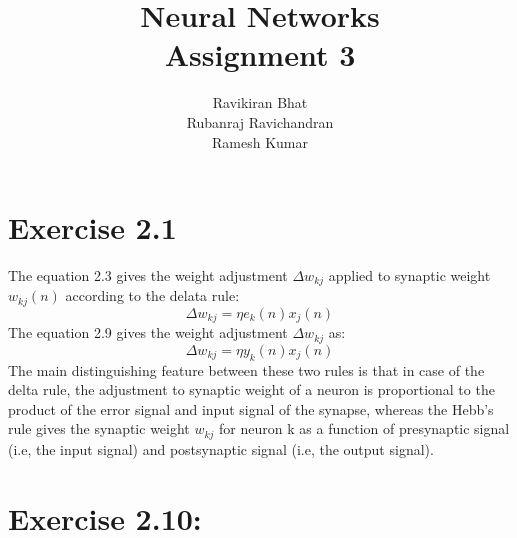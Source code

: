 \documentclass[12pt]{article}
\title{\Huge Neural Networks \\
[6mm]
Assignment 3\\}
\author{Ravikiran Bhat\\
Rubanraj Ravichandran\\
Ramesh Kumar}
\begin{document}
\maketitle
\newpage
\section{Exercise 2.1}
The equation 2.3 gives the weight adjustment $\Delta w_{kj}$ applied to synaptic weight $w_{kj}(n)$ according to the delata rule: \\
$$\Delta w_{kj} = \eta e_{k}(n) x_{j}(n)$$  
The equation 2.9 gives the weight adjustment $\Delta w_{kj}$ as: $$\Delta w_{kj} = \eta y_{k}(n) x_{j}(n)$$  
The main distinguishing feature between these two rules is that in case of the delta rule, the adjustment to synaptic weight of a neuron is proportional to the product of the error signal and input signal of the synapse, whereas the Hebb's rule gives the synaptic weight $w_{kj}$ for neuron k as a function of presynaptic signal (i.e, the input signal) and postsynaptic signal (i.e, the output signal).   
\section{Exercise 2.10:}
\end{document}
